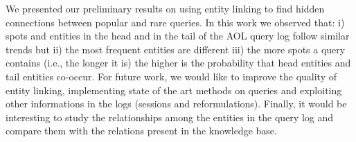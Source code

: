 We presented our preliminary results on using entity linking 
to find hidden connections between popular and rare queries. 
In this work we observed that: i) spots and entities 
in the head and in the tail of the AOL query log follow similar trends but ii) 
the most frequent entities are different iii) the more spots a query contains 
(i.e., the longer it is) the higher is the probability that head entities and
tail entities co-occur. For future work, we would like to improve the quality 
of entity linking, implementing state of the art methods on queries and
exploiting other informations in the logs (sessions and reformulations). 
Finally, it would be interesting to study the relationships among the entities in the query log
and compare them with the relations present in the knowledge base.
